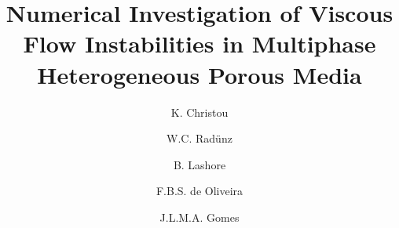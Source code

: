 \documentclass[preprint,authoryear,12pt]{elsarticle}
\begin{document}
\begin{frontmatter}



  \title{ Numerical Investigation of Viscous Flow Instabilities in Multiphase Heterogeneous Porous Media}%

\author[UoA]{K. Christou} \author[UoA,UFRGS]{W.C. Rad\"unz}  \author[UoA]{B. Lashore} \author[UESC]{F.B.S. de Oliveira}
\author[UoA]{J.L.M.A. Gomes}

\address[UoA]{Mechanics of Fluids, Soils \& Structures Group, School of Engineering, University of Aberdeen, UK}
\address[UFRGS]{Engineering School, Federal University of Rio Grande do Sul, Brazil}
\address[UESC]{Department of Exact and Technological Sciences, State University of Santa Cruz, Bahia, Brazil}


\end{frontmatter}
\end{document}
